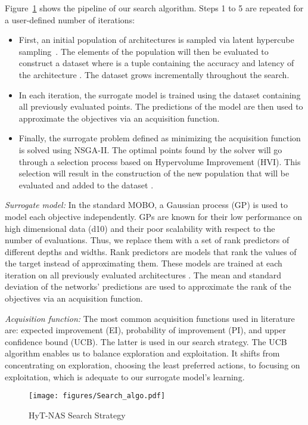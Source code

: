 \documentclass[conference]{IEEEtran}
\begin{document}
Figure~\ref{fig:search_algo} shows the pipeline of our search algorithm. Steps 1 to 5 are repeated for a user-defined number of iterations:
\begin{itemize}
    \item First, an initial population of architectures  is sampled via latent hypercube sampling~\cite{DBLP:journals/technometrics/McKayBC00}. The elements of the population  will then be evaluated to construct a dataset  where   is a tuple containing the accuracy and latency of the architecture . The dataset  grows incrementally throughout the search.
    \item In each iteration, the surrogate model is trained using the dataset containing all previously evaluated points. The predictions of the model are then used to approximate the objectives via an acquisition function.
    \item Finally, the surrogate problem defined as minimizing the acquisition function is solved using NSGA-II. The optimal points found by the solver will go through a selection process based on Hypervolume Improvement (HVI). This selection will result in the construction of the new population  that will be evaluated and added to the dataset .
\end{itemize}

\textit{Surrogate model:} In the standard MOBO, a Gaussian process (GP) is used to model each objective independently. GPs are known for their low performance on high dimensional data (d10) and their poor scalability with respect to the number of evaluations. Thus, we replace them with a set of rank predictors of different depths and widths. 
Rank predictors are models that rank the values of the target instead of approximating them. These models are trained at each iteration on all previously evaluated architectures . The mean and standard deviation of the networks' predictions are used to approximate the rank of the objectives via an acquisition function.

\textit{Acquisition function:} The most common acquisition functions used in literature are: expected improvement (EI), probability of improvement (PI), and upper confidence bound (UCB). The latter is used in our search strategy. The UCB algorithm enables us to balance exploration and exploitation. It shifts from concentrating on exploration, choosing the least preferred actions, to focusing on exploitation, which is adequate to our surrogate model's learning.
\begin{figure}[t]
    \centering
    \texttt{[image: figures/Search\_algo.pdf]}
    \caption{HyT-NAS Search Strategy }
    \label{fig:search_algo}
    \vspace{-0.5cm}
\end{figure}
\end{document}
